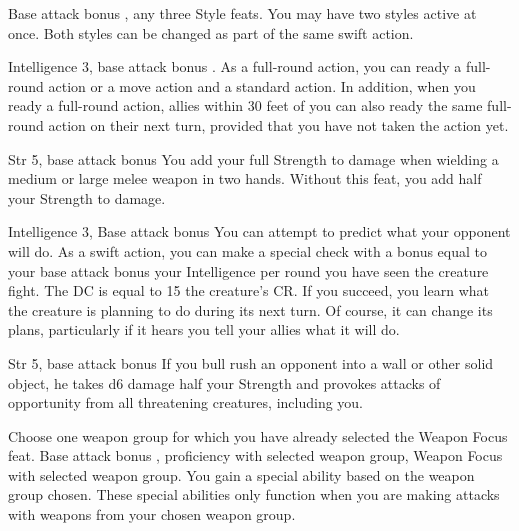 \featpre Base attack bonus , any three Style feats.
\featben You may have two styles active at once. Both styles can be changed as part of the same swift action.

\featpre Intelligence 3, base attack bonus .
\featben As a full-round action, you can ready a full-round action or a move action and a standard action. In addition, when you ready a full-round action, allies within 30 feet of you can also ready the same full-round action on their next turn, provided that you have not taken the action yet.

 Str 5, base attack bonus 
 You add your full Strength to damage when wielding a medium or large melee weapon in two hands.
 Without this feat, you add half your Strength to damage.

 Intelligence 3, Base attack bonus 
 You can attempt to predict what your opponent will do. As a swift action, you can make a special check with a bonus equal to your base attack bonus \add your Intelligence  per round you have seen the creature fight. The DC is equal to 15 \add the creature's CR. If you succeed, you learn what the creature is planning to do during its next turn. Of course, it can change its plans, particularly if it hears you tell your allies what it will do.

\featpre Str 5, base attack bonus 
\featben If you bull rush an opponent into a wall or other solid object, he takes d6 damage \add half your Strength and provokes attacks of opportunity from all threatening creatures, including you.

Choose one weapon group for which you have already selected the Weapon Focus feat.
 Base attack bonus , proficiency with selected weapon group, Weapon Focus with selected weapon group.
\featben You gain a special ability based on the weapon group chosen. These special abilities only function when you are making attacks with weapons from your chosen weapon group.

